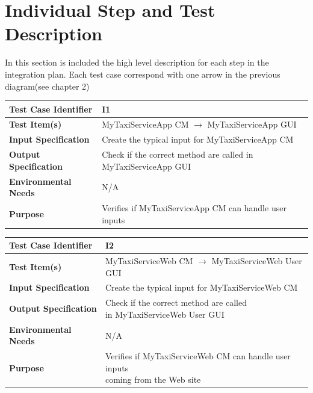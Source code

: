 \documentclass[11pt,titlepage]{article} %
\begin{document}
\newpage
\section{Individual Step and Test Description}
  In this section is included the high level description for each step in the integration plan.
  Each test case correspond with one arrow in the previous diagram(see chapter 2)
  
  \begin{table}[ht!]
    \begin{tabular*}{16cm}{ll}
	\hline
	\textbf{Test Case Identifier} & I1\\
	\hline
	\textbf{Test Item(s)} & MyTaxiServiceApp CM $ \longrightarrow $ MyTaxiServiceApp GUI \\
	\hline
	\textbf{Input Specification} & Create the typical input for MyTaxiServiceApp CM\\
	\hline
	\textbf{Output Specification} & Check if the correct method are called in MyTaxiServiceApp GUI\\
	\hline
	\textbf{Environmental Needs} & N/A\\
	\hline
	\textbf{Purpose} & Verifies if MyTaxiServiceApp CM can handle user inputs \\
	\hline
    \end{tabular*}
  \end{table}
  
  \begin{table}[ht!]
    \begin{tabular*}{16cm}{ll}
	\hline
	\textbf{Test Case Identifier} & I2\\
	\hline
	\textbf{Test Item(s)} & MyTaxiServiceWeb CM $ \longrightarrow $ MyTaxiServiceWeb User GUI \\
	\hline
	\textbf{Input Specification} & Create the typical input for MyTaxiServiceWeb CM\\
	\hline
	\textbf{Output Specification} & \pbox{20cm}{Check if the correct method are called \\ in MyTaxiServiceWeb User GUI} \\
	\hline
	\textbf{Environmental Needs} & N/A\\
	\hline
	\textbf{Purpose} & \pbox{20cm}{Verifies if MyTaxiServiceWeb CM can handle user inputs \\ coming from the Web site} \\
	\hline
    \end{tabular*}
  \end{table}
  
\end{document}
